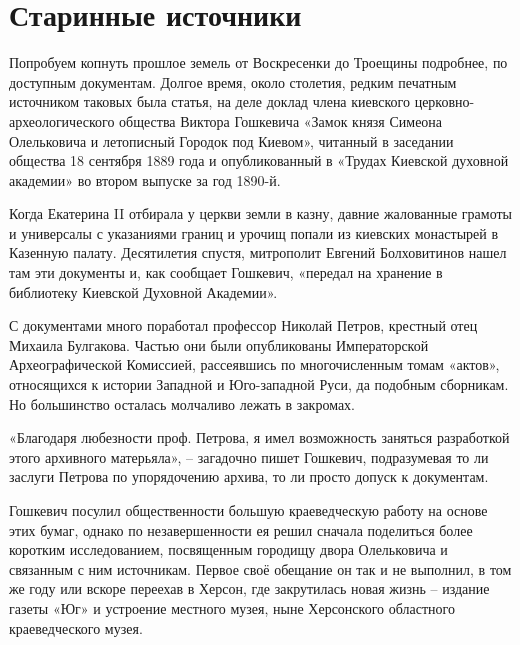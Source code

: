 \chapter{Старинные источники}

Попробуем копнуть прошлое земель от Воскресенки до Троещины подробнее, по доступным документам. Долгое время, около столетия, редким печатным источником таковых была статья, на деле доклад члена киевского церковно-археологи\-ческого общества Виктора Гошкевича «Замок князя Симеона Олельковича и летописный Городок под Киевом», читанный в заседании общества 18 сентября 1889 года и опубликованный в «Трудах Киевской духовной академии» во втором выпуске за год 1890-й.

Когда Екатерина II отбирала у церкви земли в казну, давние жалованные грамоты и универсалы с указаниями границ и урочищ попали из киевских монастырей в Казенную палату. Десятилетия спустя, митрополит Евгений Болховитинов нашел там эти документы и, как сообщает Гошкевич, «передал на хранение в библиотеку Киевской Духовной Академии».

С документами много поработал профессор Николай Петров, крестный отец Михаила Булгакова. Частью они были опубликованы Императорской Археографической Комиссией, рассеявшись по многочисленным томам «актов», относящихся к истории Западной и Юго-западной Руси, да подобным сборникам. Но большинство осталась молчаливо лежать в закромах. 

«Благодаря любезности проф. Петрова, я имел возможность заняться разработкой этого архивного матерьяла», – загадочно пишет Гошкевич, подразумевая то ли заслуги Петрова по упорядочению архива, то ли просто допуск к документам.

Гошкевич посулил общественности большую краеведческую работу на основе этих бумаг, однако по незавершенности ея решил сначала поделиться более коротким исследованием, посвященным городищу двора Олельковича и связанным с ним источникам. Первое своё обещание он так и не выполнил, в том же году или вскоре переехав в Херсон, где закрутилась новая жизнь – издание газеты «Юг» и устроение местного музея, ныне Херсонского областного краеведческого музея.

